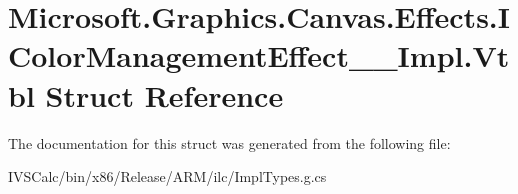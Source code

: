 \hypertarget{struct_microsoft_1_1_graphics_1_1_canvas_1_1_effects_1_1_i_color_management_effect_____impl_1_1_vtbl}{}\section{Microsoft.\+Graphics.\+Canvas.\+Effects.\+I\+Color\+Management\+Effect\+\_\+\+\_\+\+Impl.\+Vtbl Struct Reference}
\label{struct_microsoft_1_1_graphics_1_1_canvas_1_1_effects_1_1_i_color_management_effect_____impl_1_1_vtbl}


The documentation for this struct was generated from the following file\+:\begin{DoxyCompactItemize}
\item 
I\+V\+S\+Calc/bin/x86/\+Release/\+A\+R\+M/ilc/Impl\+Types.\+g.\+cs\end{DoxyCompactItemize}
